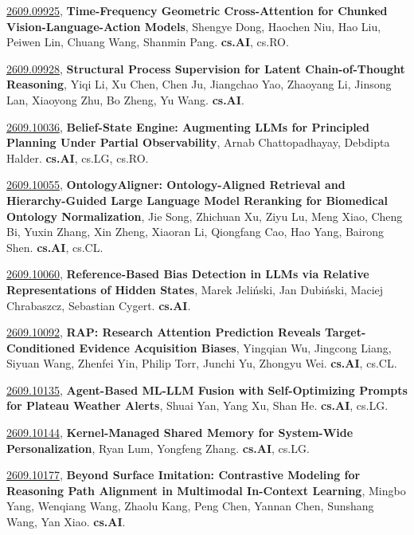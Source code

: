 \documentclass[9pt, a4paper]{article}
\theoremstyle{plain}
\theoremstyle{definition}
\theoremstyle{remark}
\newcommand{\arxivwithtarget}[3]{\hypertarget{#1}{}\href{https://arxiv.org/abs/#1}{#1}, \textbf{\textcolor{arxivblue}{#2}}, #3. }
\begin{document}
\arxivwithtarget{2609.09925}{Time-Frequency Geometric Cross-Attention for Chunked Vision-Language-Action Models}{Shengye Dong, Haochen Niu, Hao Liu, Peiwen Lin, Chuang Wang, Shanmin Pang}\textbf{cs.AI}, cs.RO.



\arxivwithtarget{2609.09928}{Structural Process Supervision for Latent Chain-of-Thought Reasoning}{Yiqi Li, Xu Chen, Chen Ju, Jiangchao Yao, Zhaoyang Li, Jinsong Lan, Xiaoyong Zhu, Bo Zheng, Yu Wang}\textbf{cs.AI}.



\arxivwithtarget{2609.10036}{Belief-State Engine: Augmenting LLMs for Principled Planning Under Partial Observability}{Arnab Chattopadhayay, Debdipta Halder}\textbf{cs.AI}, cs.LG, cs.RO.



\arxivwithtarget{2609.10055}{OntologyAligner: Ontology-Aligned Retrieval and Hierarchy-Guided Large Language Model Reranking for Biomedical Ontology Normalization}{Jie Song, Zhichuan Xu, Ziyu Lu, Meng Xiao, Cheng Bi, Yuxin Zhang, Xin Zheng, Xiaoran Li, Qiongfang Cao, Hao Yang, Bairong Shen}\textbf{cs.AI}, cs.CL.



\arxivwithtarget{2609.10060}{Reference-Based Bias Detection in LLMs via Relative Representations of Hidden States}{Marek Jeliński, Jan Dubiński, Maciej Chrabaszcz, Sebastian Cygert}\textbf{cs.AI}.



\arxivwithtarget{2609.10092}{RAP: Research Attention Prediction Reveals Target-Conditioned Evidence Acquisition Biases}{Yingqian Wu, Jingcong Liang, Siyuan Wang, Zhenfei Yin, Philip Torr, Junchi Yu, Zhongyu Wei}\textbf{cs.AI}, cs.CL.



\arxivwithtarget{2609.10135}{Agent-Based ML-LLM Fusion with Self-Optimizing Prompts for Plateau Weather Alerts}{Shuai Yan, Yang Xu, Shan He}\textbf{cs.AI}, cs.LG.



\arxivwithtarget{2609.10144}{Kernel-Managed Shared Memory for System-Wide Personalization}{Ryan Lum, Yongfeng Zhang}\textbf{cs.AI}, cs.LG.



\arxivwithtarget{2609.10177}{Beyond Surface Imitation: Contrastive Modeling for Reasoning Path Alignment in Multimodal In-Context Learning}{Mingbo Yang, Wenqiang Wang, Zhaolu Kang, Peng Chen, Yannan Chen, Sunshang Wang, Yan Xiao}\textbf{cs.AI}.
\end{document}
